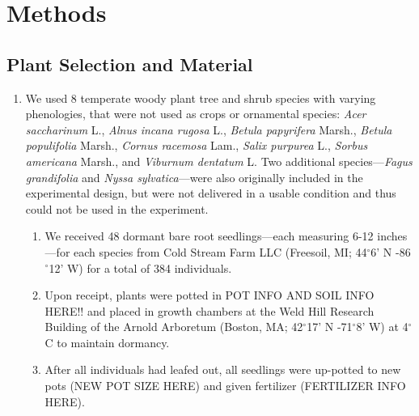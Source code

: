 \documentclass{article}\usepackage[]{graphicx}\usepackage[]{color}
\begin{document}
\section*{Methods}
\subsection*{Plant Selection and Material}
\begin{enumerate}
\item We used 8 temperate woody plant tree and shrub species with varying phenologies, that were not used as crops or ornamental species: \textit{Acer saccharinum} L., \textit{Alnus incana rugosa} L., \textit{Betula papyrifera} Marsh., \textit{Betula populifolia} Marsh., \textit{Cornus racemosa} Lam., \textit{Salix purpurea} L., \textit{Sorbus americana} Marsh., and \textit{Viburnum dentatum} L. Two additional species---\textit{Fagus grandifolia} and \textit{Nyssa sylvatica}---were also originally included in the experimental design, but were not delivered in a usable condition and thus could not be used in the experiment.
  \begin{enumerate}
  \item We received 48 dormant bare root seedlings---each measuring 6-12 inches---for each species from Cold Stream Farm LLC (Freesoil, MI; 44$^{\circ}$6' N -86$^{\circ}$12' W) for a total of 384 individuals.
  \item Upon receipt, plants were potted in POT INFO AND SOIL INFO HERE!! and placed in growth chambers at the Weld Hill Research Building of the Arnold Arboretum (Boston, MA; 42$^{\circ}$17' N -71$^{\circ}$8' W) at 4$^{\circ}$C to maintain dormancy.
  \item After all individuals had leafed out, all seedlings were up-potted to new pots (NEW POT SIZE HERE) and given fertilizer (FERTILIZER INFO HERE).
  \end{enumerate}
\end{enumerate}
\end{document}
